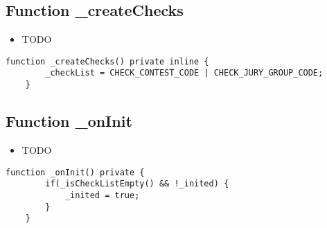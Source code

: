 \subsection{Function \_{}createChecks}

\begin{itemize}
\item TODO
\end{itemize}

\begin{lstlisting}[firstnumber=21]
    function _createChecks() private inline {
        _checkList = CHECK_CONTEST_CODE | CHECK_JURY_GROUP_CODE;
    }
\end{lstlisting}

\subsection{Function \_{}onInit}

\begin{itemize}
\item TODO
\end{itemize}

\begin{lstlisting}[firstnumber=56]
    function _onInit() private {
        if(_isCheckListEmpty() && !_inited) {
            _inited = true;
        }
    }
\end{lstlisting}
